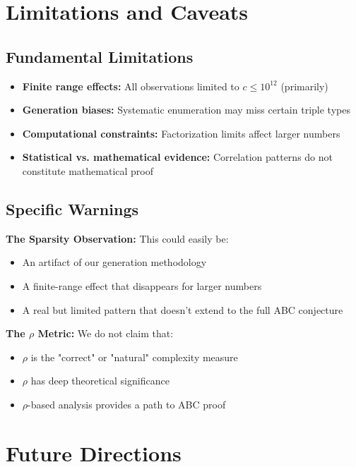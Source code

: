 \documentclass[11pt,a4paper]{article}
\begin{document}
\section{Limitations and Caveats}

\subsection{Fundamental Limitations}

\begin{itemize}
    \item \textbf{Finite range effects:} All observations limited to $c \leq 10^{12}$ (primarily)
    \item \textbf{Generation biases:} Systematic enumeration may miss certain triple types
    \item \textbf{Computational constraints:} Factorization limits affect larger numbers
    \item \textbf{Statistical vs. mathematical evidence:} Correlation patterns do not constitute mathematical proof
\end{itemize}

\subsection{Specific Warnings}

\textbf{The Sparsity Observation:}
This could easily be:
\begin{itemize}
    \item An artifact of our generation methodology
    \item A finite-range effect that disappears for larger numbers
    \item A real but limited pattern that doesn't extend to the full ABC conjecture
\end{itemize}

\textbf{The $\rho$ Metric:}
We do not claim that:
\begin{itemize}
    \item $\rho$ is the "correct" or "natural" complexity measure
    \item $\rho$ has deep theoretical significance
    \item $\rho$-based analysis provides a path to ABC proof
\end{itemize}

\section{Future Directions}
\end{document}
